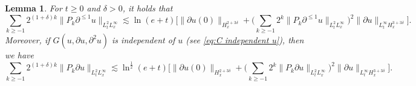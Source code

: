 \documentclass[11pt,twoside]{article}
\def\f{\frac}
\def\p{\partial}
\def\ls{\lesssim}
\theoremstyle{plain}
\newtheorem{lemma}[theorem]{Lemma}
\theoremstyle{definition}
\numberwithin{equation}{section}
\begin{document}
\begin{lemma}\label{lem:Estimate of Besov norm}
	For $t\ge0$ and $\delta>0$, it holds that
	\begin{equation}\label{ineq:Estimate of Besov norm}
	\sum_{k\ge -1}2^{(1+\delta) k}\|P_k\p^{\le 1} u\|_{L^{2}_tL^\infty_x}
	\ls
	\ln(e+t)
	\big[\|\p u(0)\|_{H_x^{2+3\delta}}+
	\big(\sum_{k \geq -1}2^k\|P_k\p^{\le 1} u\|_{L^2_tL^\infty_x}\big)^2\|\p u\|_{L^\infty_t H_x^{3+3\delta}}\big].
	\end{equation}
Moreover, if $G(u, \p u, \p^2 u)$ is independent of $u$ (see \eqref{eq:C independent u}), then we have
	\begin{equation}
		\sum_{k\ge -1}2^{(1+\delta) k}\|P_k\p u\|_{L^{2}_tL^\infty_x}
		\ls
		\ln^{\f12}(e+t)
		\big[\|\p u(0)\|_{H_x^{2+3\delta}}+
		\big(\sum_{k \geq -1}2^k\|P_k\p u\|_{L^2_tL^\infty_x}\big)^2\|\p u\|_{L^\infty_t H_x^{3+3\delta}}\big].
	\end{equation}
\end{lemma}		
\end{document}
